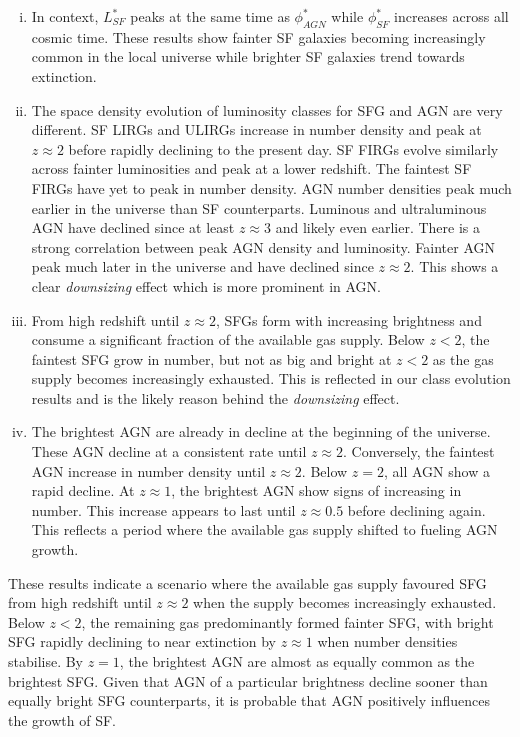 \begin{enumerate}[(i)]
    \item In context, $L^{*}_{SF}$ peaks at the same time as $\phi^{*}_{AGN}$ while $\phi^{*}_{SF}$ increases across all cosmic time. These results show fainter SF galaxies becoming increasingly common in the local universe while brighter SF galaxies trend towards extinction.  

    \item The space density evolution of luminosity classes for SFG and AGN are very different. SF LIRGs and ULIRGs increase in number density and peak at $z \approx 2$ before rapidly declining to the present day. SF FIRGs evolve similarly across fainter luminosities and peak at a lower redshift. The faintest SF FIRGs have yet to peak in number density. AGN number densities peak much earlier in the universe than SF counterparts. Luminous and ultraluminous AGN have declined since at least $z \approx 3$ and likely even earlier. There is a strong correlation between peak AGN density and luminosity. Fainter AGN peak much later in the universe and have declined since $z \approx 2$. This shows a clear \textit{downsizing} effect which is more prominent in AGN.

    \item From high redshift until $z\approx2$, SFGs form with increasing brightness and consume a significant fraction of the available gas supply. Below $z<2$, the faintest SFG grow in number, but not as big and bright at $z<2$ as the gas supply becomes increasingly exhausted. This is reflected in our class evolution results and is the likely reason behind the \textit{downsizing} effect.

    \item The brightest AGN are already in decline at the beginning of the universe. These AGN decline at a consistent rate until $z\approx2$. Conversely, the faintest AGN increase in number density until $z\approx2$. Below $z=2$, all AGN show a rapid decline. At $z\approx1$, the brightest AGN show signs of increasing in number. This increase appears to last until $z\approx0.5$ before declining again. This reflects a period where the available gas supply shifted to fueling AGN growth.
\end{enumerate}

These results indicate a scenario where the available gas supply favoured SFG from high redshift until $z\approx2$ when the supply becomes increasingly exhausted. Below $z<2$, the remaining gas predominantly formed fainter SFG, with bright SFG rapidly declining to near extinction by $z\approx1$ when number densities stabilise. By $z=1$, the brightest AGN are almost as equally common as the brightest SFG. Given that AGN of a particular brightness decline sooner than equally bright SFG counterparts, it is probable that AGN positively influences the growth of SF.

